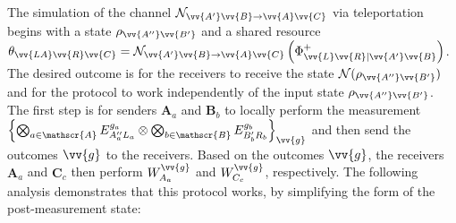 \documentclass[aps,pra,twocolumn,superscriptaddress,longbibliography]{revtex4-1}
\def\({\left(}
\def\){\right)}
\newcommand{\mc}[1]{\mathcal{#1}}
\newcommand{\tf}[1]{\textbf{#1}}
\newcommand{\msc}[1]{\mathscr{#1}}
\begin{document}
\begin{appendix}
The simulation of the channel $\mc{N}_{\vv{A'}\vv{B}\to\vv{A}\vv{C}}$ via teleportation begins with a state $\rho_{\vv{A''}\vv{B'}}$ and a shared resource $\theta_{\vv{LA}\vv{R}\vv{C}}=\mc{N}_{\vv{A'}\vv{B}\to\vv{A}\vv{C}}\(\Phi^+_{\vv{L}\vv{R}|\vv{A'}\vv{B}}\)$. The desired outcome is for the receivers to receive
the state $\mathcal{N}(\rho_{\vv{A''}\vv{B'}})$ and for the protocol to work independently of the input state
$\rho_{\vv{A''}\vv{B'}}$. The first step is for senders $\tf{A}_a$ and $\tf{B}_b$ to locally
perform the measurement $\left\{\bigotimes_{a\in\msc{A}}E_{A''_aL_a}^{g_a}\otimes\bigotimes_{b\in\msc{B}}E_{B_b'R_b}^{g_b}\right\}_{\vv{g}}$ and then send the outcomes $\vv{g}$ to the
receivers. Based on the outcomes $\vv{g}$, the receivers $\tf{A}_a$ and $\tf{C}_c$ then perform
$W_{A_a}^{\vv{g}}$ and $W_{C_c}^{\vv{g}}$, respectively. The following analysis demonstrates that this
protocol works, by simplifying the form of the post-measurement state:


\end{appendix}
\end{document}
